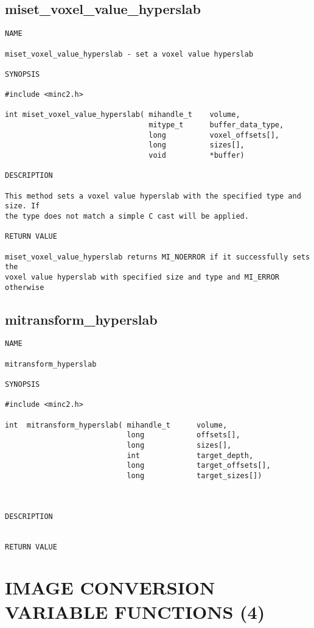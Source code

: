 \documentclass{article}
\begin{document}
\subsection{miset\_voxel\_value\_hyperslab}
\begin{verbatim}
NAME

miset_voxel_value_hyperslab - set a voxel value hyperslab

SYNOPSIS

#include <minc2.h>

int miset_voxel_value_hyperslab( mihandle_t    volume,
                                 mitype_t      buffer_data_type,
                                 long          voxel_offsets[],
                                 long          sizes[],
                                 void          *buffer)

DESCRIPTION

This method sets a voxel value hyperslab with the specified type and size. If
the type does not match a simple C cast will be applied.

RETURN VALUE

miset_voxel_value_hyperslab returns MI_NOERROR if it successfully sets the
voxel value hyperslab with specified size and type and MI_ERROR otherwise
\end{verbatim}

\subsection{mitransform\_hyperslab}
\begin{verbatim}
NAME 

mitransform_hyperslab

SYNOPSIS

#include <minc2.h>

int  mitransform_hyperslab( mihandle_t      volume,
                            long            offsets[],    
                            long            sizes[],
                            int             target_depth,
                            long            target_offsets[],
                            long            target_sizes[])
                                
                        
                                
DESCRIPTION


RETURN VALUE

\end{verbatim}

\section{IMAGE CONVERSION VARIABLE FUNCTIONS (4)}
\end{document}
